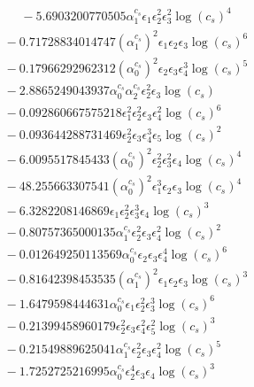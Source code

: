 \documentclass[10pt]{article}
\begin{document}
\begin{align*}
\phantom{F_{s,7}} &\phantom{={}}{}  - 5.6903200770505 \alpha_{1}^{c_s} \epsilon_{1} \epsilon_{2}^{2} \epsilon_{3}^{2} \log{\left(c_{s} \right)}^{4} \\
&{}  - 0.71728834014747 \left(\alpha_{1}^{c_s}\right)^{2} \epsilon_{1} \epsilon_{2} \epsilon_{3} \log{\left(c_{s} \right)}^{6} \\
&{}  - 0.17966292962312 \left(\alpha_{0}^{c_s}\right)^{2} \epsilon_{2} \epsilon_{3} \epsilon_{4}^{3} \log{\left(c_{s} \right)}^{5} \\
&{}  - 2.8865249043937 \alpha_{0}^{c_s} \alpha_{2}^{c_s} \epsilon_{2}^{2} \epsilon_{3} \log{\left(c_{s} \right)} \\
&{}  - 0.092860667575218 \epsilon_{1}^{2} \epsilon_{2}^{2} \epsilon_{3} \epsilon_{4}^{2} \log{\left(c_{s} \right)}^{6} \\
&{}  - 0.093644288731469 \epsilon_{2}^{2} \epsilon_{3} \epsilon_{4}^{3} \epsilon_{5} \log{\left(c_{s} \right)}^{2} \\
&{}  - 6.0095517845433 \left(\alpha_{0}^{c_s}\right)^{2} \epsilon_{2}^{2} \epsilon_{3}^{2} \epsilon_{4} \log{\left(c_{s} \right)}^{4} \\
&{}  - 48.255663307541 \left(\alpha_{0}^{c_s}\right)^{2} \epsilon_{1}^{3} \epsilon_{2} \epsilon_{3} \log{\left(c_{s} \right)}^{4} \\
&{}  - 6.3282208146869 \epsilon_{1} \epsilon_{2}^{2} \epsilon_{3}^{3} \epsilon_{4} \log{\left(c_{s} \right)}^{3} \\
&{}  - 0.80757365000135 \alpha_{1}^{c_s} \epsilon_{2}^{2} \epsilon_{3} \epsilon_{4}^{2} \log{\left(c_{s} \right)}^{2} \\
&{}  - 0.012649250113569 \alpha_{0}^{c_s} \epsilon_{2} \epsilon_{3} \epsilon_{4}^{4} \log{\left(c_{s} \right)}^{6} \\
&{}  - 0.81642398453535 \left(\alpha_{1}^{c_s}\right)^{2} \epsilon_{1} \epsilon_{2} \epsilon_{3} \log{\left(c_{s} \right)}^{3} \\
&{}  - 1.6479598444631 \alpha_{0}^{c_s} \epsilon_{1} \epsilon_{2}^{2} \epsilon_{3}^{3} \log{\left(c_{s} \right)}^{6} \\
&{}  - 0.21399458960179 \epsilon_{2}^{2} \epsilon_{3} \epsilon_{4}^{2} \epsilon_{5}^{2} \log{\left(c_{s} \right)}^{3} \\
&{}  - 0.21549889625041 \alpha_{1}^{c_s} \epsilon_{2}^{2} \epsilon_{3} \epsilon_{4}^{2} \log{\left(c_{s} \right)}^{5} \\
&{}  - 1.7252725216995 \alpha_{0}^{c_s} \epsilon_{2}^{4} \epsilon_{3} \epsilon_{4} \log{\left(c_{s} \right)}^{3} \\

\end{align*}
\end{document}
